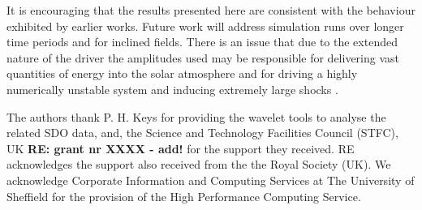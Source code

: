 \documentclass{aastex62}
\begin{document}
It is encouraging that the results presented here are consistent with the behaviour exhibited  by earlier works. Future work will address simulation runs over longer time periods and for inclined fields. There is an issue that due to the extended nature of the driver the amplitudes used may be responsible for delivering vast quantities of energy into the solar atmosphere and for driving a highly numerically unstable system and inducing extremely large shocks \citet{Santamaria2015}. 

\acknowledgments

The authors thank P. H. Keys for providing the wavelet tools to analyse the related SDO data, and, the Science and Technology Facilities Council (STFC), UK {\bf RE: grant nr XXXX - add!} for the support they received.  RE acknowledges the support also received from the the Royal Society (UK). We acknowledge Corporate Information and Computing Services at The University of Sheffield for the provision of the High Performance Computing Service.


%




\end{document}
